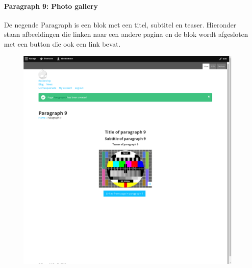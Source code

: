 \paragraph{Paragraph 9: Photo gallery}
De negende Paragraph is een blok met een titel, subtitel en teaser. Hieronder staan afbeeldingen die linken naar een andere pagina en de blok wordt afgesloten met een button die ook een link bevat.
\begin{figure}[h]
\includegraphics[width=1\textwidth]{img/p009.png}
\end{figure}

\clearpage

